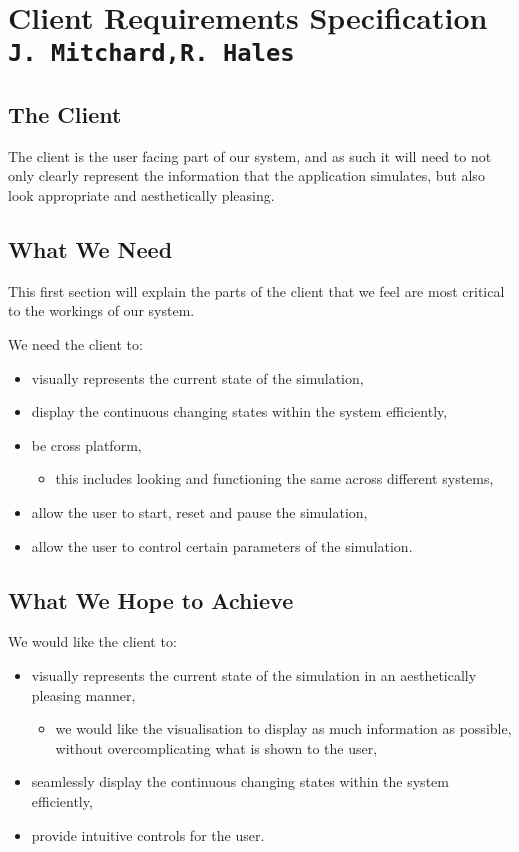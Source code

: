 \pagestyle{empty}

\section{Client Requirements Specification\\{\small\tt{J.~Mitchard,R.~Hales}}}

\subsection{The Client}
The client is the user facing part of our system, and as such it will need to not only clearly represent the information that the application simulates, but also look appropriate and aesthetically pleasing.

\subsection{What We Need}
This first section will explain the parts of the client that we feel are most critical to the workings of our system. 

We need the client to:
\begin{itemize}
	\item visually represents the current state of the simulation,
	\item display the continuous changing states within the system efficiently,
	\item be cross platform,
	\begin{itemize}
		\item this includes looking and functioning the same across different systems,
	\end{itemize}
	\item allow the user to start, reset and pause the simulation,
	\item allow the user to control certain parameters of the simulation.
\end{itemize}

\subsection{What We Hope to Achieve}
We would like the client to:
\begin{itemize}
	\item visually represents the current state of the simulation in an aesthetically pleasing manner,
	\begin{itemize}
		\item we would like the visualisation to display as much information as possible, without overcomplicating what is shown to the user,
	\end{itemize}
	\item seamlessly display the continuous changing states within the system efficiently,
	\item provide intuitive controls for the user.
\end{itemize}

\clearpage
\endinput
